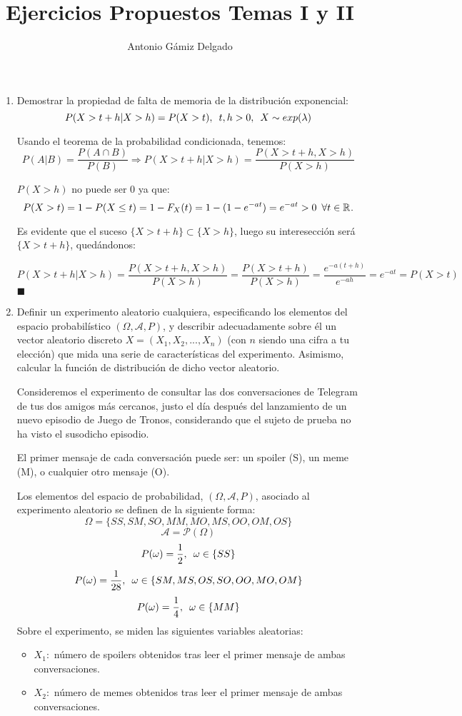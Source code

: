 \documentclass[12pt]{article}
\newcommand{\R}[1][]{\mathbb{R}^{#1}}
\newcommand{\A}{\mathcal{A}}
\newcommand{\qued}{\hfill$\blacksquare$}
\begin{document}

\author{Antonio Gámiz Delgado}
\title{Ejercicios Propuestos Temas I y II}
\maketitle


\begin{enumerate}
\item Demostrar la propiedad de falta de memoria de la distribución exponencial:
\[
P(X>t+h|X>h)=P(X>t), \enskip t,h>0, \enskip X\sim exp(\lambda)
\]

Usando el teorema de la probabilidad condicionada, tenemos:
\[
P(A|B)=\frac{P(A\cap B)}{P(B)}\Longrightarrow P(X>t+h|X>h) =\frac{P(X>t+h, X>h)}{P(X>h)}
\]

$P(X>h)$ no puede ser 0 ya que:
\[
P(X>t)=1-P(X\leq t)=1-F_X(t)=1-(1-e^{-at})=e^{-at} > 0 \enskip \forall t \in \R.
\]

Es evidente que el suceso $\{X>t+h\}\subset\{X>h\}$, luego su interesección será $\{X>t+h\}$, quedándonos:

\[
P(X>t+h|X>h) =\frac{P(X>t+h, X>h)}{P(X>h)}=\frac{P(X>t+h)}{P(X>h)}=\frac{e^{-a(t+h)}}{e^{-ah}}=e^{-at}=P(X>t)
\]
\qued

\item Definir un experimento aleatorio cualquiera, especificando los elementos del espacio probabilístico $(\Omega, \mathcal{A}, P)$, y describir adecuadamente sobre él un vector aleatorio discreto $X=(X_1,X_2, ...,X_n)$ (con $n$ siendo una cifra a tu elección) que mida una serie de características del experimento. Asimismo, calcular la función de distribución de dicho vector aleatorio.

Consideremos el experimento de consultar las dos conversaciones de Telegram de tus dos amigos más cercanos, justo el día después del lanzamiento de un nuevo episodio de Juego de Tronos, considerando que el sujeto de prueba no ha visto el susodicho episodio. 

El primer mensaje de cada conversación puede ser: un spoiler (S), un meme (M), o cualquier otro mensaje (O).

Los elementos del espacio de probabilidad, $(\Omega, \mathcal{A}, P)$, asociado al experimento aleatorio se definen de la siguiente forma:
\[
\Omega=\{SS,SM,SO,MM,MO,MS, OO, OM, OS\}
\]
\[
\A=\mathcal{P}(\Omega)
\]
\[
P(\omega)=\frac{1}{2}, \enskip \omega\in\{SS\}
\]
\[
P(\omega)=\frac{1}{28}, \enskip \omega\in\{SM,MS,OS,SO, OO, MO, OM\}
\]
\[
P(\omega)=\frac{1}{4}, \enskip \omega\in\{MM\}
\]
Sobre el experimento, se miden las siguientes variables aleatorias:
\begin{itemize}
\item $X_1:$ número de spoilers obtenidos tras leer el primer mensaje de ambas conversaciones.
\item $X_2:$ número de memes obtenidos tras leer el primer mensaje de ambas conversaciones.
\end{itemize}


\end{enumerate}
\end{document}
